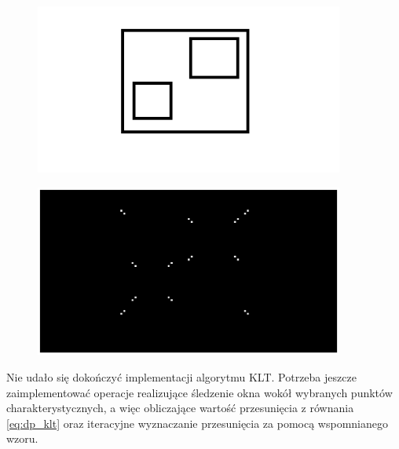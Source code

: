 \begin{figure}[H]
	\centering
	\includegraphics[width=4in]{test.png}
\end{figure}

\begin{figure}[H]
	\centering
	\includegraphics[width=4in]{test_out.eps}
\end{figure}

Nie udało się dokończyć implementacji algorytmu KLT. Potrzeba jeszcze zaimplementować operacje realizujące śledzenie okna wokół wybranych punktów charakterystycznych, a więc obliczające wartość przesunięcia z równania \ref{eq:dp_klt} oraz iteracyjne wyznaczanie przesunięcia za pomocą wspomnianego wzoru.